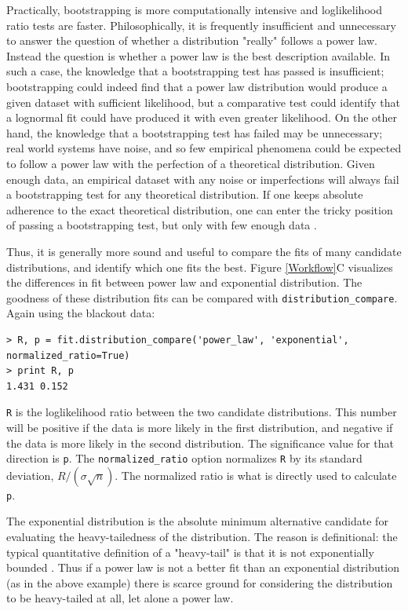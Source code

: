 \documentclass[10pt]{article}
\begin{document}
Practically, bootstrapping is more computationally intensive and loglikelihood ratio tests are faster. Philosophically, it is frequently insufficient and unnecessary to answer the question of whether a distribution "really" follows a power law. Instead the question is whether a power law is the best description available. In such a case, the knowledge that a bootstrapping test has passed is insufficient; bootstrapping could indeed find that a power law distribution would produce a given dataset with sufficient likelihood, but a comparative test could identify that a lognormal fit could have produced it with even greater likelihood. On the other hand, the knowledge that a bootstrapping test has failed may be unnecessary; real world systems have noise, and so few empirical phenomena could be expected to follow a power law with the perfection of a theoretical distribution. Given enough data, an empirical dataset with any noise or imperfections will always fail a bootstrapping test for any theoretical distribution. If one keeps absolute adherence to the exact theoretical distribution, one can enter the tricky position of passing a bootstrapping test, but only with few enough data \cite{Klaus2011}. 

Thus, it is generally more sound and useful to compare the fits of many candidate distributions, and identify which one fits the best. Figure \ref{Workflow}C visualizes the differences in fit between power law and exponential distribution. The goodness of these distribution fits can be compared with  \verb$distribution_compare$. Again using the blackout data:

\begin{verbatim}
> R, p = fit.distribution_compare('power_law', 'exponential', normalized_ratio=True)
> print R, p
1.431 0.152
\end{verbatim}

\verb$R$ is the loglikelihood ratio between the two candidate distributions. This number will be positive if the data is more likely in the first distribution, and negative if the data is more likely in the second distribution. The significance value for that direction is \verb$p$. The \verb$normalized_ratio$ option normalizes \verb$R$ by its standard deviation, $R/(\sigma \sqrt{n})$. The normalized ratio is what is directly used to calculate \verb$p$.

The exponential distribution is the absolute minimum alternative candidate for evaluating the heavy-tailedness of the distribution. The reason is definitional: the typical quantitative definition of a "heavy-tail" is that it is not exponentially bounded \cite{Asmussen2003}. Thus if a power law is not a better fit than an exponential distribution (as in the above example) there is scarce ground for considering the distribution to be heavy-tailed at all, let alone a power law. 
\end{document}
